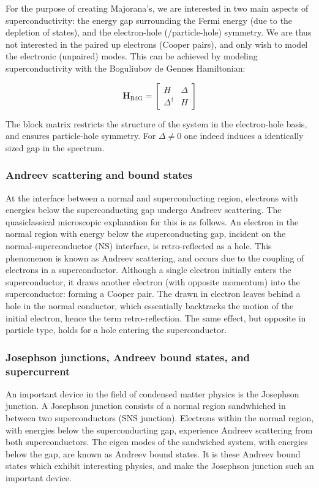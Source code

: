 		For the purpose of creating Majorana's, we are interested in two main aspects of superconductivity: the energy gap surrounding the Fermi energy (due to the depletion of states), and the electron-hole (/particle-hole) symmetry.
		We are thus not interested in the paired up electrons (Cooper pairs), and only wish to model the electronic (unpaired) modes.
		This can be achieved by modeling superconductivity with the Boguliubov de Gennes Hamiltonian:
		
		\begin{equation}
		\mathbf{H}_\text{BdG} = \begin{bmatrix} H & \Delta \\ \Delta^\dagger & H \end{bmatrix}
		\end{equation}

		The block matrix restricts the structure of the system in the electron-hole basis, and ensures particle-hole symmetry.
		For $\Delta \neq 0$ one indeed induces a identically sized gap in the spectrum.

		\subsubsection{Andreev scattering and bound states}
			At the interface between a normal and superconducting region, electrons with energies below the superconducting gap undergo Andreev scattering.
			The quasiclassical microscopic explanation for this is as follows.
			An electron in the normal region with energy below the superconducting gap, incident on the normal-superconductor (NS) interface, is retro-reflected as a hole.
			This phenomenon is known as Andreev scattering, and occurs due to the coupling of electrons in a superconductor.
			Although a single electron initially enters the superconductor, it draws another electron (with opposite momentum) into the superconductor: forming a Cooper pair.
			The drawn in electron leaves behind a hole in the normal conductor, which essentially backtracks the motion of the initial electron, hence the term retro-reflection.
			The same effect, but opposite in particle type, holds for a hole entering the superconductor.


		\subsubsection{Josephson junctions, Andreev bound states, and supercurrent}
			An important device in the field of condensed matter physics is the Josephson junction.
			A Josephson junction consists of a normal region sandwhiched in between two superconductors (SNS junction).
			Electrons within the normal region, with energies below the superconducting gap, experience Andreev scattering from both superconductors.
			The eigen modes of the sandwiched system, with energies below the gap, are known as Andreev bound states.
			It is these Andreev bound states which exhibit interesting physics, and make the Josephson junction such an important device.

